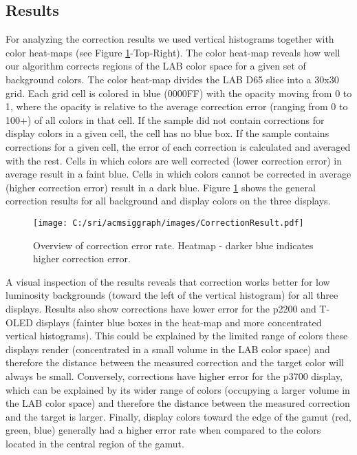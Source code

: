 \documentclass[annual]{acmsiggraph}
\begin{document}
\subsection{Results}
For analyzing the correction results we used vertical histograms together with color heat-maps (see Figure \ref{fig:Figure11}-Top-Right). The color heat-map reveals how well our algorithm corrects regions of the LAB color space for a given set of background colors. The color heat-map divides the LAB D65 slice into a 30x30 grid. Each grid cell is colored in blue (0000FF) with the opacity moving from 0 to 1, where the opacity is relative to the average correction error (ranging from 0 to 100+) of all colors in that cell. If the sample did not contain corrections for display colors in a given cell, the cell has no blue box. If the sample contains corrections for a given cell, the error of each correction is calculated and averaged with the rest. Cells in which colors are well corrected (lower correction error) in average result in a faint blue. Cells in which colors cannot be corrected in average (higher correction error) result in a dark blue. Figure \ref{fig:Figure11} shows the general correction results for all background and display colors on the three displays.
\begin{figure}[ht]
  \centering
  \texttt{[image: C:/sri/acmsiggraph/images/CorrectionResult.pdf]}
  \caption{Overview of correction error rate. Heatmap - darker blue indicates higher correction error.}
  \label{fig:Figure11}
\end{figure}

A visual inspection of the results reveals that correction works better for low luminosity backgrounds (toward the left of the vertical histogram) for all three displays. Results also show corrections have lower error for the p2200 and T-OLED displays (fainter blue boxes in the heat-map and more concentrated vertical histograms). This could be explained by the limited range of colors these displays render (concentrated in a small volume in the LAB color space) and therefore the distance between the measured correction and the target color will always be small. Conversely, corrections have higher error for the p3700 display, which can be explained by its wider range of colors (occupying a larger volume in the LAB color space) and therefore the distance between the measured correction and the target is larger. Finally, display colors toward the edge of the gamut (red, green, blue) generally had a higher error rate when compared to the colors located in the central region of the gamut.
\end{document}
